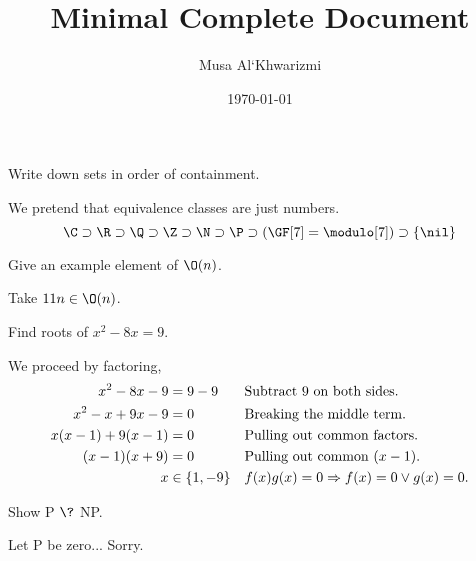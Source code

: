 \documentclass{homework}
\author{Musa Al`Khwarizmi}
\date{\today}
\title{Minimal Complete Document}
\begin{document}
 \maketitle

\question Write down sets in order of containment.

We pretend that equivalence classes are just numbers.
\[
  \C \supset \R \supset \Q \supset \Z \supset \N \supset
  \P \supset (\GF[7] = \modulo[7])  \supset \{\nil\}
\]

\question Give an example element of $\O(n)$.

Take $11n \in \O(n)$.

\question Find roots of $x^2- 8x = 9$.

We proceed by factoring,
\begin{align*}
  x^2- 8x - 9         & = 9-9         &  & \text{Subtract 9 on both sides.}         \\
  x^2- x + 9x - 9     & = 0           &  & \text{Breaking the middle term.}         \\
  x(x - 1) + 9(x - 1) & = 0           &  & \text{Pulling out common factors.}       \\
  (x - 1)(x + 9)      & = 0           &  & \text{Pulling out common } (x - 1).      \\
  x                   & \in \{1, -9\} &  & f(x)g(x) = 0 \Rightarrow f(x) = 0 \vee g(x) = 0. \\
\end{align*}

\question Show P $\?$ NP.

Let P be zero... Sorry.
\end{document}
